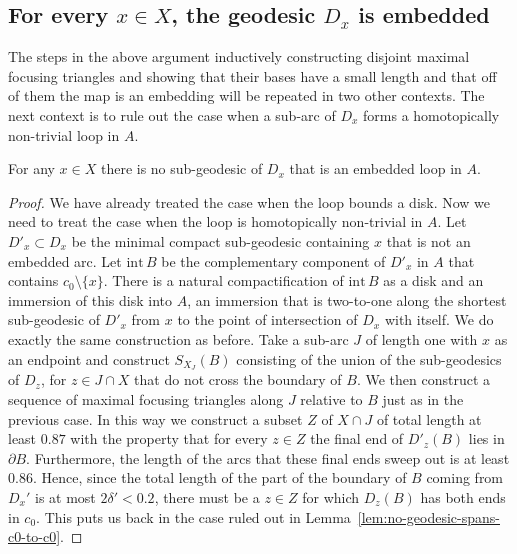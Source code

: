 \subsection{For every $x\in X$, the geodesic $D_x$ is embedded}

The steps in the above argument inductively constructing disjoint
maximal focusing triangles and showing that their bases have a small
 length and that off of them the map is an embedding will be
repeated in two other contexts. The next context is to rule out the
case when a sub-arc of $D_x$  forms a homotopically non-trivial loop
in $A$.


\begin{lemma}
\label{lem:geodesic-no-embedded-loop-general}
For any $x\in X$ there is no sub-geodesic of $D_x$ that is an
embedded loop in $A$.
\end{lemma}

\begin{proof}
We have already treated the case when the loop bounds a disk. Now we
need to treat the case when the loop is homotopically non-trivial in
$A$. Let $D'_x\subset D_x$ be the minimal compact sub-geodesic
containing $x$ that is not an embedded arc. Let $\mathrm{int}\,B$ be
the complementary component of $D'_x$ in $A$ that contains
$c_0\setminus\{x\}$. There is a natural compactification of $\mathrm{int}\, B$ as a disk and an immersion of this disk into $A$, an
immersion that is two-to-one along the shortest sub-geodesic of
$D'_x$ from $x$ to the point of intersection of $D_x$ with itself.
We do exactly the same construction as before. Take a sub-arc $J$ of
length one with $x$ as an endpoint and construct $S_{X_J}(B)$
consisting of the union of the sub-geodesics of $D_z$, for $z\in
J\cap X$ that do not cross the boundary of $B$. We then construct a
sequence of maximal focusing triangles along $J$ relative to $B$
just as in the previous case. In this way we construct a subset $Z$
of $X\cap J$ of total length at least $0.87$ with the property that
for every $z\in Z$ the final end of $D'_z(B)$ lies in $\partial B$.
Furthermore, the length of the arcs that these final ends sweep out
is at least $0.86$. Hence, since the total length of the part of the
boundary of $B$ coming from $D_x'$ is at most $2\delta'<0.2$, there
must be a $z\in Z$ for which $D_z(B)$ has both ends in $c_0$. This
puts us back in the case ruled out in Lemma~\ref{lem:no-geodesic-spans-c0-to-c0}.
\end{proof}

